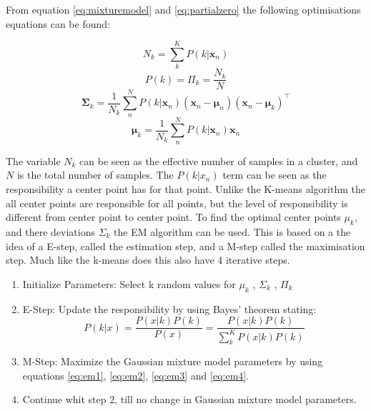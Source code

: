 From equation \ref{eq:mixturemodel} and \ref{eq:partialzero} the following optimisations equations can be found: 

\begin{equation}
 N_k = \sum\limits_{k}^K P(k|\textbf{x}_n)
 \label{eq:em1}
\end{equation}
\begin{equation}
 P(k)= \Pi_k = \frac{N_k}{N}
 \label{eq:em2}
\end{equation}
\begin{equation}
 \mathbold{\Sigma}_k= \frac{1}{N_k} \sum\limits_{n}^N{ P(k|\textbf{x}_n) (\textbf{x}_n -\mathbold{\mu}_n)(\textbf{x}_n-\mathbold{\mu}_k)^\intercal}
 \label{eq:em3}
\end{equation}
\begin{equation}
 \mathbold{\mu}_k= \frac{1}{N_k} \sum\limits_{n}^N{ P(k|\mathbold{x}_n) \mathbold{x}_n}
 \label{eq:em4}
\end{equation}

The variable $N_k$ can be seen as the effective number of samples in a cluster, and $N$ is the total number of samples. The $P(k|x_n)$ term can be seen as the responsibility a center point has for that point. Unlike the K-means algorithm the all center points are responsible for all points, but the level of responsibility is different from center point to center point. To find the optimal center points $\mu_k$, and there deviations $\Sigma_k$ the EM algorithm can be used. This is based on a the idea of a E-step, called the estimation step, and a M-step called the maximisation step. Much like the k-means does this also have 4 iterative steps. 


\begin{enumerate}
  \item Initialize Parameters: Select k random values for $\mu_k$ , $\Sigma_k$ , $\Pi_k$
  \item E-Step: Update the responsibility by using Bayes' theorem stating: 
 \begin{equation}
 	P(k|x) = \frac{P(x|k) P(k)}{P(x)} = \frac{P(x|k) P(k)}{\sum\limits_{k}^K{ P(x|k) P(k)}}
 \end{equation}
  
  \item M-Step: Maximize the Gaussian mixture model parameters by using equations \ref{eq:em1}, \ref{eq:em2}, \ref{eq:em3} and \ref{eq:em4}. 
  
  \item Continue whit step 2, till no change in Gaussian mixture model parameters. 
\end{enumerate}

